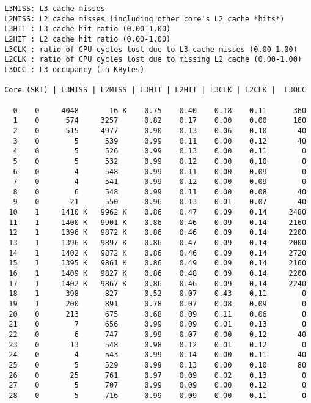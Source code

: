 \begin{lstlisting}
 L3MISS: L3 cache misses 
 L2MISS: L2 cache misses (including other core's L2 cache *hits*) 
 L3HIT : L3 cache hit ratio (0.00-1.00)
 L2HIT : L2 cache hit ratio (0.00-1.00)
 L3CLK : ratio of CPU cycles lost due to L3 cache misses (0.00-1.00)
 L2CLK : ratio of CPU cycles lost due to missing L2 cache (0.00-1.00)
 L3OCC : L3 occupancy (in KBytes)

 Core (SKT) | L3MISS | L2MISS | L3HIT | L2HIT | L3CLK | L2CLK |  L3OCC

   0    0     4048       16 K    0.75    0.40    0.18    0.11      360
   1    0      574     3257      0.82    0.17    0.00    0.00      160
   2    0      515     4977      0.90    0.13    0.06    0.10       40
   3    0        5      539      0.99    0.11    0.00    0.12       40
   4    0        5      526      0.99    0.13    0.00    0.11        0
   5    0        5      532      0.99    0.12    0.00    0.10        0
   6    0        4      548      0.99    0.11    0.00    0.09        0
   7    0        4      541      0.99    0.12    0.00    0.09        0
   8    0        6      548      0.99    0.11    0.00    0.08       40
   9    0       21      550      0.96    0.13    0.01    0.07       40
  10    1     1410 K   9962 K    0.86    0.47    0.09    0.14     2480
  11    1     1400 K   9901 K    0.86    0.46    0.09    0.14     2160
  12    1     1396 K   9872 K    0.86    0.46    0.09    0.14     2200
  13    1     1396 K   9897 K    0.86    0.47    0.09    0.14     2000
  14    1     1402 K   9872 K    0.86    0.46    0.09    0.14     2720
  15    1     1395 K   9861 K    0.86    0.49    0.09    0.14     2160
  16    1     1409 K   9827 K    0.86    0.48    0.09    0.14     2200
  17    1     1402 K   9867 K    0.86    0.46    0.09    0.14     2240
  18    1      398      827      0.52    0.07    0.43    0.11        0
  19    1      200      891      0.78    0.07    0.08    0.09        0
  20    0      213      675      0.68    0.09    0.11    0.06        0
  21    0        7      656      0.99    0.09    0.01    0.13        0
  22    0        6      747      0.99    0.07    0.00    0.12       40
  23    0       13      548      0.98    0.12    0.01    0.12        0
  24    0        4      543      0.99    0.14    0.00    0.11       40
  25    0        5      529      0.99    0.13    0.00    0.10       80
  26    0       25      761      0.97    0.09    0.02    0.13        0
  27    0        5      707      0.99    0.09    0.00    0.12        0
  28    0        5      716      0.99    0.09    0.00    0.11        0

\end{lstlisting}

